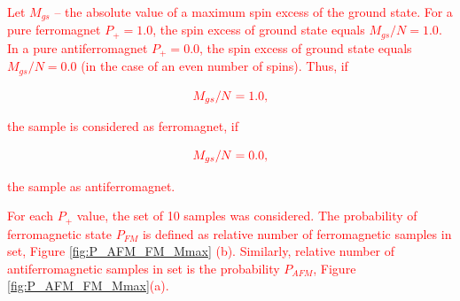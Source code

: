 \documentclass[preprint,12pt]{elsarticle}
\begin{document}
	\textcolor{red}{Let $M_{gs}$ -- the absolute value of a maximum spin excess of the ground state. For a pure ferromagnet $P_+ = 1.0$, the spin excess of ground state equals $M_{gs}/N = 1.0$. In a pure antiferromagnet $P_+ = 0.0$, the spin excess of ground state equals $M_{gs}/N = 0.0$ (in the case of an even number of spins). Thus, if}
		
	\begin{equation}
		\color{red}
		M_{gs}/N = 1.0,
		\label{eq:ferr_deffinition}
	\end{equation}
		
	\textcolor{red}{\noindent the sample is considered as ferromagnet, if}
	
	\begin{equation}
		\color{red}
		M_{gs}/N = 0.0,
		\label{eq:aferr_deffinition}
	\end{equation}
	
	\textcolor{red}{\noindent the sample as antiferromagnet.}
	
	\textcolor{red}{For each $P_+$ value, the set of 10 samples was considered. The probability of ferromagnetic state $P_{FM}$ is defined as relative number of ferromagnetic samples in set, Figure \ref{fig:P_AFM_FM_Mmax} (b). Similarly, relative number of antiferromagnetic samples in set is the probability $P_{AFM}$, Figure \ref{fig:P_AFM_FM_Mmax}(a).}
	
\end{document}
